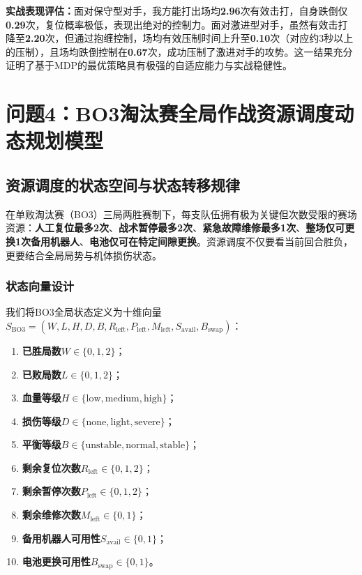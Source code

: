 \documentclass[a4paper,12pt]{article}
\numberwithin{equation}{section}
\numberwithin{table}{section}
\numberwithin{figure}{section}
\begin{document}
\textbf{实战表现评估：}面对保守型对手，我方能打出场均\textbf{2.96}次有效击打，自身跌倒仅\textbf{0.29}次，复位概率极低，表现出绝对的控制力。面对激进型对手，虽然有效击打降至\textbf{2.20}次，但通过抱缠控制，场均有效压制时间上升至\textbf{0.10}次（对应约3秒以上的压制），且场均跌倒控制在\textbf{0.67}次，成功压制了激进对手的攻势。这一结果充分证明了基于MDP的最优策略具有极强的自适应能力与实战稳健性。

\section{问题4：BO3淘汰赛全局作战资源调度动态规划模型}

\subsection{资源调度的状态空间与状态转移规律}

在单败淘汰赛（BO3）三局两胜赛制下，每支队伍拥有极为关键但次数受限的赛场资源：\textbf{人工复位最多2次}、\textbf{战术暂停最多2次}、\textbf{紧急故障维修最多1次}、\textbf{整场仅可更换1次备用机器人}、\textbf{电池仅可在特定间隙更换}。资源调度不仅要看当前回合胜负，更要结合全局局势与机体损伤状态。

\subsubsection{状态向量设计}

我们将BO3全局状态定义为十维向量$S_{\text{BO3}} = (W, L, H, D, B, R_{\text{left}}, P_{\text{left}}, M_{\text{left}}, S_{\text{avail}}, B_{\text{swap}})$：
\begin{enumerate}
    \item \textbf{已胜局数}$W \in \{0, 1, 2\}$；
    \item \textbf{已败局数}$L \in \{0, 1, 2\}$；
    \item \textbf{血量等级}$H \in \{\text{low}, \text{medium}, \text{high}\}$；
    \item \textbf{损伤等级}$D \in \{\text{none}, \text{light}, \text{severe}\}$；
    \item \textbf{平衡等级}$B \in \{\text{unstable}, \text{normal}, \text{stable}\}$；
    \item \textbf{剩余复位次数}$R_{\text{left}} \in \{0, 1, 2\}$；
    \item \textbf{剩余暂停次数}$P_{\text{left}} \in \{0, 1, 2\}$；
    \item \textbf{剩余维修次数}$M_{\text{left}} \in \{0, 1\}$；
    \item \textbf{备用机器人可用性}$S_{\text{avail}} \in \{0, 1\}$；
    \item \textbf{电池更换可用性}$B_{\text{swap}} \in \{0, 1\}$。
\end{enumerate}
\end{document}
